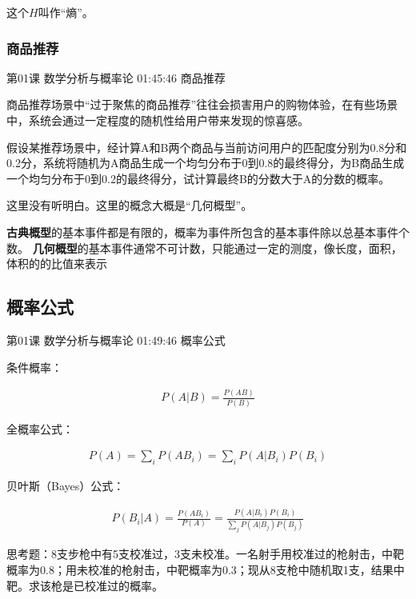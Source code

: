 \documentclass[UTF8]{ctexart}
\begin{document}
这个$H$叫作“熵”。

\subsubsection{商品推荐}

第01课 数学分析与概率论 01:45:46 商品推荐

商品推荐场景中“过于聚焦的商品推荐”往往会损害用户的购物体验，在有些场景中，系统会通过一定程度的随机性给用户带来发现的惊喜感。

假设某推荐场景中，经计算A和B两个商品与当前访问用户的匹配度分别为0.8分和0.2分，系统将随机为A商品生成一个均匀分布于0到0.8的最终得分，为B商品生成一个均匀分布于0到0.2的最终得分，试计算最终B的分数大于A的分数的概率。

这里没有听明白。这里的概念大概是“几何概型”。

\textbf{古典概型}的基本事件都是有限的，概率为事件所包含的基本事件除以总基本事件个数。
\textbf{几何概型}的基本事件通常不可计数，只能通过一定的测度，像长度，面积，体积的的比值来表示


\subsection{概率公式}

第01课 数学分析与概率论 01:49:46 概率公式

条件概率：

\begin{equation}
\begin{aligned}
P(A|B)=\frac{P(AB)}{P(B)}
\end{aligned}
\end{equation}

全概率公式：

\begin{equation}
\begin{aligned}
P(A)=\sum_{i}P(AB_{i})=\sum_{i}P(A|B_{i})P(B_{i})
\end{aligned}
\end{equation}

贝叶斯（Bayes）公式：

\begin{equation}
\begin{aligned}
P(B_{i}|A)=\frac{P(AB_{i})}{P(A)}=\frac{P(A|B_{i})P(B_{i})}{\sum_{j}P(A|B_{j})P(B_{j})}
\end{aligned}
\end{equation}

思考题：8支步枪中有5支校准过，3支未校准。一名射手用校准过的枪射击，中靶概率为0.8；用未校准的枪射击，中靶概率为0.3；现从8支枪中随机取1支，结果中靶。求该枪是已校准过的概率。
\end{document}
